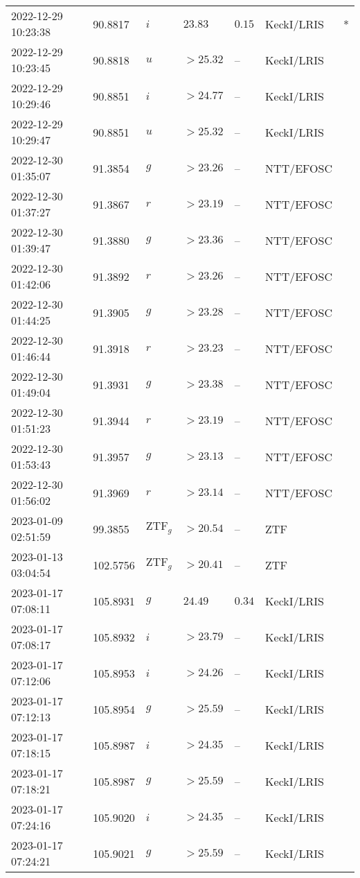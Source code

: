 \documentclass{nature_plusfigure}
\begin{document}
\begin{supplement}
\begin{center}
\begin{longtable}{lllllll}
2022-12-29 10:23:38 & 90.8817 & $i$ & $23.83$ & $0.15$ & KeckI/LRIS & * \\ 
2022-12-29 10:23:45 & 90.8818 & $u$ & $>25.32$ & -- & KeckI/LRIS &  \\ 
2022-12-29 10:29:46 & 90.8851 & $i$ & $>24.77$ & -- & KeckI/LRIS &  \\ 
2022-12-29 10:29:47 & 90.8851 & $u$ & $>25.32$ & -- & KeckI/LRIS &  \\ 
2022-12-30 01:35:07 & 91.3854 & $g$ & $>23.26$ & -- & NTT/EFOSC &  \\ 
2022-12-30 01:37:27 & 91.3867 & $r$ & $>23.19$ & -- & NTT/EFOSC &  \\ 
2022-12-30 01:39:47 & 91.3880 & $g$ & $>23.36$ & -- & NTT/EFOSC &  \\ 
2022-12-30 01:42:06 & 91.3892 & $r$ & $>23.26$ & -- & NTT/EFOSC &  \\ 
2022-12-30 01:44:25 & 91.3905 & $g$ & $>23.28$ & -- & NTT/EFOSC &  \\ 
2022-12-30 01:46:44 & 91.3918 & $r$ & $>23.23$ & -- & NTT/EFOSC &  \\ 
2022-12-30 01:49:04 & 91.3931 & $g$ & $>23.38$ & -- & NTT/EFOSC &  \\ 
2022-12-30 01:51:23 & 91.3944 & $r$ & $>23.19$ & -- & NTT/EFOSC &  \\ 
2022-12-30 01:53:43 & 91.3957 & $g$ & $>23.13$ & -- & NTT/EFOSC &  \\ 
2022-12-30 01:56:02 & 91.3969 & $r$ & $>23.14$ & -- & NTT/EFOSC &  \\ 
2023-01-09 02:51:59 & 99.3855 & $\mathrm{ZTF}_{g}$ & $>20.54$ & -- & ZTF &  \\ 
2023-01-13 03:04:54 & 102.5756 & $\mathrm{ZTF}_{g}$ & $>20.41$ & -- & ZTF &  \\ 
2023-01-17 07:08:11 & 105.8931 & $g$ & $24.49$ & $0.34$ & KeckI/LRIS &  \\ 
2023-01-17 07:08:17 & 105.8932 & $i$ & $>23.79$ & -- & KeckI/LRIS &  \\ 
2023-01-17 07:12:06 & 105.8953 & $i$ & $>24.26$ & -- & KeckI/LRIS &  \\ 
2023-01-17 07:12:13 & 105.8954 & $g$ & $>25.59$ & -- & KeckI/LRIS &  \\ 
2023-01-17 07:18:15 & 105.8987 & $i$ & $>24.35$ & -- & KeckI/LRIS &  \\ 
2023-01-17 07:18:21 & 105.8987 & $g$ & $>25.59$ & -- & KeckI/LRIS &  \\ 
2023-01-17 07:24:16 & 105.9020 & $i$ & $>24.35$ & -- & KeckI/LRIS &  \\ 
2023-01-17 07:24:21 & 105.9021 & $g$ & $>25.59$ & -- & KeckI/LRIS &  \\ 

\end{longtable}
\end{center}
\end{supplement}
\end{document}
